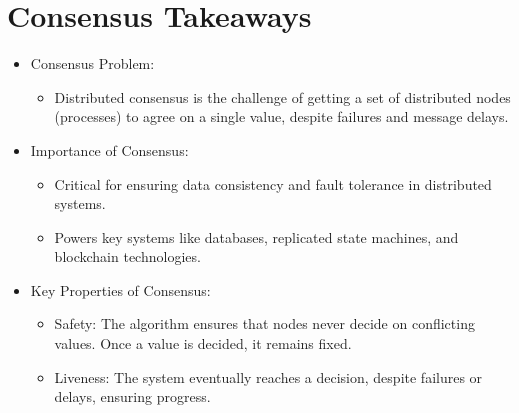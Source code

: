 \section{Consensus Takeaways}
\begin{itemize}
	\item Consensus Problem:
	      \begin{itemize}
		      \item Distributed consensus is the challenge of getting a set of distributed nodes (processes) to agree on a single value, despite failures and message delays.
	      \end{itemize}
	\item Importance of Consensus:
	      \begin{itemize}
		      \item Critical for ensuring data consistency and fault tolerance in distributed systems.
		      \item Powers key systems like databases, replicated state machines, and blockchain technologies.
	      \end{itemize}
	\item Key Properties of Consensus:
	      \begin{itemize}
		      \item Safety: The algorithm ensures that nodes never decide on conflicting values. Once a value is decided, it
		            remains fixed.
		      \item Liveness: The system eventually reaches a decision, despite failures or delays, ensuring progress.


\end{itemize}
\end{itemize}
